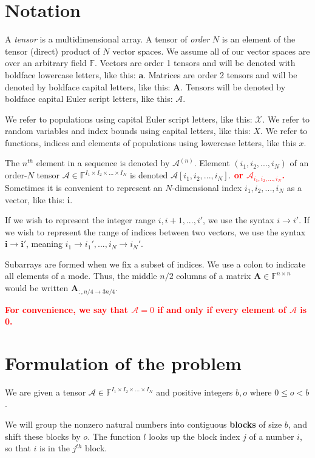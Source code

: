 \documentclass[12pt]{article}
\theoremstyle{dfn}
\numberwithin{equation}{section}
\numberwithin{figure}{section}
\newcommand{\todo}[1] {\textbf{\textcolor{red}{#1}}}
\renewcommand{\vec}[1] {\mathbf{#1}}
\newcommand{\Mat}[1] {\mathbf{#1}}
\newcommand{\Ten}[1] {\mathbf{\mathcal{#1}}}
\newcommand{\Pop}[1] {\mathcal{#1}}
\newcommand{\F} {\mathbb{F}}
\begin{document}
  \section{Notation}
    A \textit{tensor} is a multidimensional array. A tensor of \textit{order} $N$ is an element of the tensor (direct) product of $N$ vector spaces. We assume all of our vector spaces are over an arbitrary field $\F$. Vectors are order 1 tensors and will be denoted with boldface lowercase letters, like this: $\vec{a}$. Matrices are order 2 tensors and will be denoted by boldface capital letters, like this: $\Mat{A}$. Tensors will be denoted by boldface capital Euler script letters, like this: $\Ten{A}$.

    We refer to populations using capital Euler script letters, like this: $\Pop{X}$. We refer to random variables and index bounds using capital letters, like this: $X$. We refer to functions, indices and elements of populations using lowercase letters, like this $x$.

    The $n^{th}$ element in a sequence is denoted by $\Ten{A}^{(n)}$.
    Element $(i_1, i_2, ..., i_N)$ of an order-$N$ tensor $\Ten{A} \in \F^{I_1 \times I_2 \times ... \times I_N}$ is denoted $ \Ten{A}[i_1, i_2, ..., i_N]$.\todo{ or $\Ten{A}_{i_1, i_2, ..., i_N}$.}
    Sometimes it is convenient to represent an $N$-dimensional index $i_1, i_2, ..., i_N$ as a vector, like this: $\vec{i}$.

    If we wish to represent the integer range $i, i + 1, ..., i'$, we use the syntax $i \to i'$. If we wish to represent the range of indices between two vectors, we use the syntax $\vec{i} \to \vec{i}'$, meaning $i_1 \to i_1', ..., i_N \to i_N'$.

    Subarrays are formed when we fix a subset of indices. We use a colon to indicate all elements of a mode. Thus, the middle $n/2$ columns of a matrix $\Mat{A} \in \F^{n \times n}$ would be written $\Mat{A}_{:, n/4 \to 3n/4}$.

    \todo{For convenience, we say that $\Ten{A} = 0$ if and only if every element of $\Ten{A}$ is 0.}

  \section{Formulation of the problem}
    We are given a tensor $\Ten{A} \in \F^{I_1 \times I_2 \times ... \times I_N}$ and positive integers $b, o$ where $0 \leq o < b$.

    We will group the nonzero natural numbers into contiguous \textbf{blocks} of size $b$, and shift these blocks by $o$. The function $l$ looks up the block index $j$ of a number $i$, so that $i$ is in the $j^{th}$ block.
\end{document}
